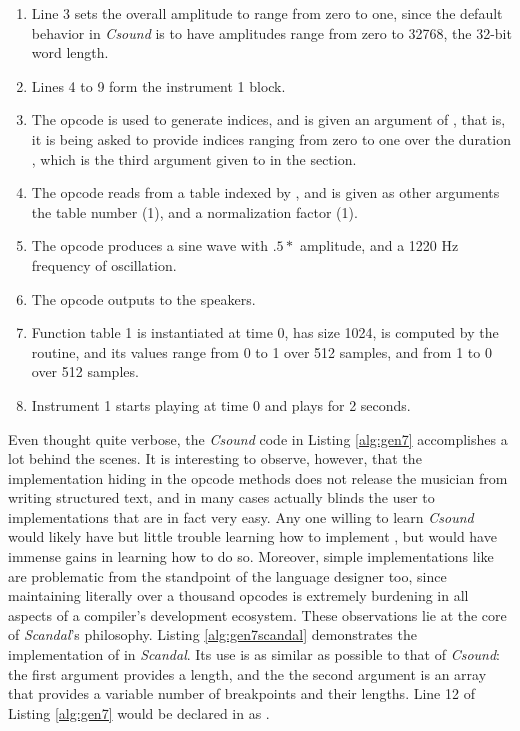 \begin{enumerate}
	\addtocounter{enumi}{2}
	\item Line 3 sets the overall amplitude to range from zero to one, since the default behavior in \emph{Csound} is to have amplitudes range from zero to 32768, the 32-bit word length.
	\item Lines 4 to 9 form the instrument 1 block.
	\item The  opcode is used to generate indices, and is given an argument of , that is, it is being asked to provide indices ranging from zero to one over the duration , which is the third argument given to  in the  section.
	\item The  opcode reads from a table indexed by , and is given as other arguments the table number (1), and a normalization factor (1).
	\item The  opcode produces a sine wave with $.5 * $  amplitude, and a 1220 Hz frequency of oscillation.
	\item The  opcode outputs  to the speakers.
	\addtocounter{enumi}{2}
	\item Function table 1 is instantiated at time 0, has size 1024, is computed by the  routine, and its values range from 0 to 1 over 512 samples, and from 1 to 0 over 512 samples.
	\item Instrument 1 starts playing at time 0 and plays for 2 seconds.
\end{enumerate}

Even thought quite verbose, the \emph{Csound} code in Listing \ref{alg:gen7} accomplishes a lot behind the scenes. It is interesting to observe, however, that the implementation hiding in the opcode methods does not release the musician from writing structured text, and in many cases actually blinds the user to implementations that are in fact very easy. Any one willing to learn \emph{Csound} would likely have but little trouble learning how to implement , but would have immense gains in learning how to do so. Moreover, simple implementations like  are problematic from the standpoint of the language designer too, since maintaining literally over a thousand opcodes is extremely burdening in all aspects of a compiler's development ecosystem. These observations lie at the core of \emph{Scandal}'s philosophy. Listing \ref{alg:gen7scandal} demonstrates the implementation of  in \emph{Scandal}. Its use is as similar as possible to that of \emph{Csound}: the first argument provides a length, and the the second argument is an array that provides a variable number of breakpoints and their lengths. Line 12 of Listing \ref{alg:gen7} would be declared in  as .

